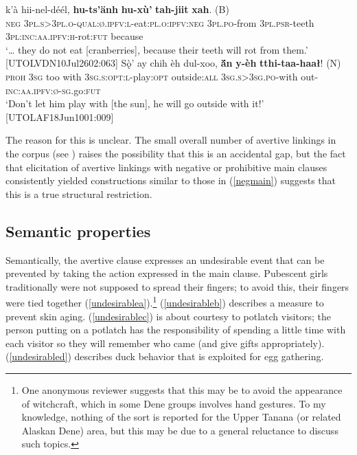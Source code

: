 \documentclass[output=paper,colorlinks,citecolor=brown
]{langscibook}
\begin{document}
\begin{exe}
\ex \label{negmain}
\begin{xlista}
\ex\label{negmaina}
\gll  {\ldots} k'à hii-nel-déél, \textbf{hu-ts'änh} \textbf{hu-xù'} \textbf{tah-jiit} {\textbf{xah}. \textnormal{(B)}}\\
{} \textsc{neg} \textsc{3pl.s>3pl.o-qual:ø.ipfv:l}-eat:\textsc{pl.o:ipfv:neg} \textsc{3pl.po}-from \textsc{3pl.psr}-teeth \textsc{3pl:inc:aa.ipfv:h}-rot:\textsc{fut} because \\
\glt `{\ldots} they do not eat [cranberries], because their teeth will rot from them.' \hfill [UTOLVDN10Jul2602:063]
\ex\label{negmainb}
\gll Sǫ̀' ay chih èh dul-xoo, \textbf{ä́n} \textbf{y-èh} {\textbf{tthi-taa-haał}! \textnormal{(N)}} \\
\textsc{proh} \textsc{3sg} too with \textsc{3sg.s:opt:l}-play:\textsc{opt} outside:\textsc{all} \textsc{3sg.s>3sg.po}-with out-\textsc{inc:aa.ipfv:ø-sg}.go:\textsc{fut}\\
\glt `Don't let him play with [the sun], he will go outside with it!' \\ \hfill [UTOLAF18Jun1001:009]
\end{xlista}
\end{exe}

The reason for this is unclear. The small overall number of avertive linkings in the corpus (see ) raises the possibility that this is an accidental gap, but the fact that elicitation of avertive linkings with negative or prohibitive main clauses consistently yielded constructions similar to those in (\ref{negmain}) suggests that this is a true structural restriction.


\subsection{Semantic properties}
\label{subsection:avertive-semantics}

Semantically, the avertive clause expresses an undesirable event that can be prevented by taking the action expressed in the main clause. Pubescent girls traditionally were not supposed to spread their fingers; to avoid this, their fingers were tied together (\ref{undesirablea}).\footnote{One anonymous reviewer suggests that this may be to avoid the appearance of witchcraft, which in some Dene groups involves hand gestures. To my knowledge, nothing of the sort is reported for the Upper Tanana (or related Alaskan Dene) area, but this may be due to a general reluctance to discuss such topics.} (\ref{undesirableb}) describes a measure to prevent skin aging. (\ref{undesirablec}) is about courtesy to potlatch visitors; the person putting on a potlatch has the responsibility of spending a little time with each visitor so they will remember who came (and give gifts appropriately). (\ref{undesirabled}) describes duck behavior that is exploited for egg gathering.
\end{document}
